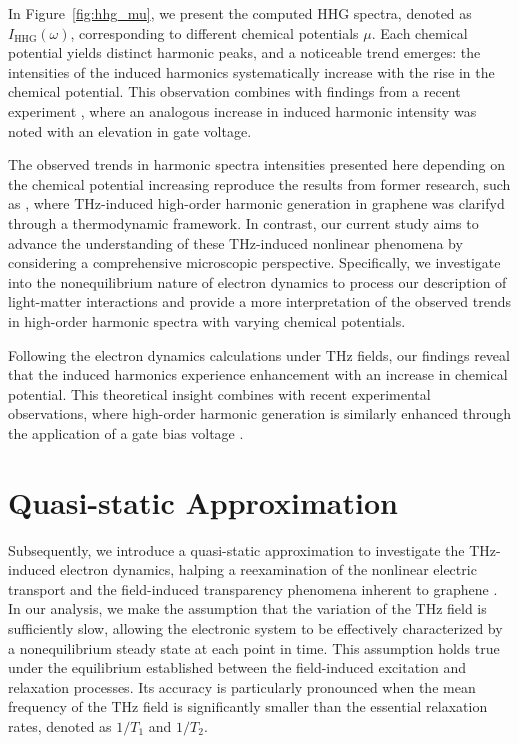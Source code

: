In Figure~\ref{fig:hhg_mu}, we present the computed HHG spectra, denoted as $I_{\mathrm{HHG}}(\omega)$, corresponding to different chemical potentials $\mu$. Each chemical potential yields distinct harmonic peaks, and a noticeable trend emerges: the intensities of the induced harmonics systematically increase with the rise in the chemical potential. This observation combines with findings from a recent experiment \cite{kovalev2021electrical}, where an analogous increase in induced harmonic intensity was noted with an elevation in gate voltage.

The observed trends in harmonic spectra intensities presented here depending on the chemical potential increasing reproduce the results from former research, such as \cite{mics2015thermodynamic}, where THz-induced high-order harmonic generation in graphene was clarifyd through a thermodynamic framework. In contrast, our current study aims to advance the understanding of these THz-induced nonlinear phenomena by considering a comprehensive microscopic perspective. Specifically, we investigate into the nonequilibrium nature of electron dynamics to process our description of light-matter interactions and provide a more  interpretation of the observed trends in high-order harmonic spectra with varying chemical potentials.

Following the electron dynamics calculations under THz fields, our findings reveal that the induced harmonics experience enhancement with an increase in chemical potential. This theoretical insight combines with recent experimental observations, where high-order harmonic generation is similarly enhanced through the application of a gate bias voltage \cite{kovalev2021electrical}.
\section{Quasi-static Approximation}
Subsequently, we introduce a quasi-static approximation to investigate the THz-induced electron dynamics, halping a reexamination of the nonlinear electric transport and the field-induced transparency phenomena inherent to graphene \cite{sato2021nonlinear}.
In our analysis, we make the assumption that the variation of the THz field is sufficiently slow, allowing the electronic system to be effectively characterized by a nonequilibrium steady state at each point in time. This assumption holds true under the equilibrium established between the field-induced excitation and relaxation processes. Its accuracy is particularly pronounced when the mean frequency of the THz field is significantly smaller than the essential relaxation rates, denoted as $1/T_1$ and $1/T_2$.

